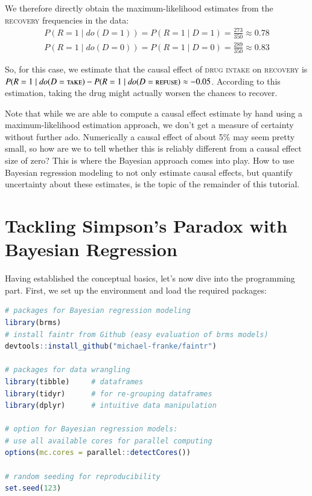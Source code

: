 \documentclass[nobib]{tufte-handout}
\newcommand{\mathdo}{\mathit{do}}
\begin{document}
We therefore directly obtain the maximum-likelihood estimates from the \textsc{recovery} frequencies in the data:
\begin{equation}
  \begin{split}
    P(R=1\mid \mathdo(D=1))
    = P(R=1\mid D=1)
    = \frac{273}{350} \approx 0.78
  \end{split}
\end{equation}
%
\begin{equation}
  \begin{split}
    P(R=1\mid \mathdo(D=0))
    = P(R=1\mid D=0)
    = \frac{289}{350} \approx 0.83
  \end{split}
\end{equation}

So, for this case, we estimate that the causal effect of \textsc{drug intake} on \textsc{recovery} is $P(R=1\mid \mathdo(D=\textsc{take})-P(R=1\mid \mathdo(D=\textsc{refuse}) \approx -0.05$.
According to this estimation, taking the drug might actually worsen the chances to recover.
\medskip

Note that while we are able to compute a causal effect estimate by hand using a maximum-likelihood estimation approach, we don't get a measure of certainty without further ado. 
Numerically a causal effect of about 5\% may seem pretty small, so how are we to tell whether this is reliably different from a causal effect size of zero?
This is where the Bayesian approach comes into play.
How to use Bayesian regression modeling to not only estimate causal effects, but quantify uncertainty about these estimates, is the topic of the remainder of this tutorial.

\section{Tackling Simpson's Paradox with Bayesian Regression} \label{sec:programming}

Having established the conceptual basics, let's now dive into the programming part. 
First, we set up the environment and load the required packages:
\begin{minipage}[]{\textwidth}
\begin{lstlisting}[language=R]
# packages for Bayesian regression modeling
library(brms) 
# install faintr from Github (easy evaluation of brms models)
devtools::install_github("michael-franke/faintr")

# packages for data wrangling
library(tibble)     # dataframes 
library(tidyr)      # for re-grouping dataframes
library(dplyr)      # intuitive data manipulation

# option for Bayesian regression models: 
# use all available cores for parallel computing
options(mc.cores = parallel::detectCores())

# random seeding for reproducibility
set.seed(123)
\end{lstlisting}
\end{minipage}
\end{document}
